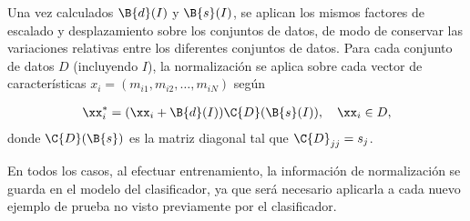 Una vez calculados $\B{d}(I)$ y $\B{s}(I)$, se aplican los mismos
factores de escalado y desplazamiento sobre  los conjuntos de
datos, de modo de conservar las variaciones relativas entre los
diferentes conjuntos de datos.
Para cada conjunto de datos $D$ (incluyendo $I$), la normalización
se aplica sobre cada vector de características
$x_i = (m_{i1}, m_{i2}, \ldots, m_{iN})$ según

\begin{align}
  \xx_i^{*} = (\xx_i + \B{d}(I)) \C{D}(\B{s}(I)),\quad \xx_i\in D,
\end{align}
donde $\C{D}(\B{s})$ es la matriz diagonal tal que $\C{D}_{jj}=s_j$.

En todos los casos, al efectuar entrenamiento, la información de
normalización se guarda en el modelo del clasificador, ya que será
necesario aplicarla a cada nuevo ejemplo de prueba no visto
previamente por el clasificador.